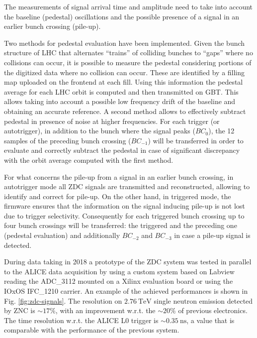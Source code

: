 The measurements of signal arrival time and amplitude need to take into account the baseline (pedestal) oscillations and the possible presence of a signal in an earlier bunch crossing (pile-up).

Two methods for pedestal evaluation have been implemented. Given the bunch structure of LHC that alternates ``trains'' of colliding bunches to ``gaps'' where no collisions can occur, it is possible to measure the pedestal considering portions of the digitized data where no collision can occur. These are identified by a filling map uploaded on the frontend at each fill. Using this information the pedestal average for each LHC orbit is computed and then transmitted on GBT. This allows taking into account a possible low frequency drift of the baseline and obtaining an accurate reference. A second method allows to effectively subtract pedestal in presence of noise at higher frequencies. For each trigger (or autotrigger), in addition to the bunch where the signal peaks ($BC_0$), the 12 samples of the preceding bunch crossing ($BC_{-1}$) will be transferred in order to evaluate and correctly subtract the pedestal in case of significant discrepancy with the orbit average computed with the first method.

For what concerns the pile-up from a signal in an earlier bunch crossing, in autotrigger mode all ZDC signals are transmitted and reconstructed, allowing to identify and correct for pile-up. On the other hand, in triggered mode, the firmware ensures that the information on the signal inducing pile-up is not lost due to trigger selectivity. Consequently for each triggered bunch crossing up to four bunch crossings will be transferred: the triggered and the preceding one (pedestal evaluation) and additionally $BC_{-2}$ and $BC_{-3}$ in case a pile-up signal is detected.

During \PbPb data taking in 2018 a prototype of the ZDC system was tested in parallel to the ALICE data acquisition by using a custom system based on Labview reading the ADC_3112 mounted on a Xilinx evaluation board or using the IOxOS IFC_1210 carrier. An example of the achieved performances is shown in Fig. \ref{fig:zdc-signals}. The resolution on $\SI{2.76}{\tera\electronvolt}$ single neutron emission detected by ZNC is $\sim17\%$, with an improvement w.r.t. the $\sim20\%$ of previous electronics. The time resolution w.r.t. the ALICE L0 trigger is $\sim\SI{0.35}{\nano\second}$, a value that is comparable with the performance of the previous system.

